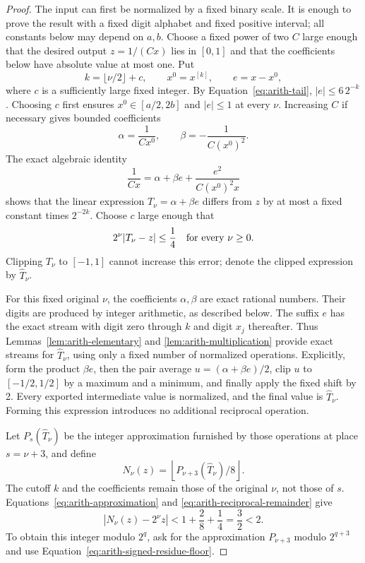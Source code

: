 \begin{proof}
The input can first be normalized by a fixed binary scale.  It is
enough to prove the result with a fixed digit alphabet and fixed
positive interval; all constants below may depend on $a,b$.
Choose a fixed power of two $C$ large enough that the desired output
$z=1/(Cx)$ lies in $[0,1]$ and that the coefficients below have
absolute value at most one.  Put
\[
 k=\lfloor \nu/2\rfloor+c,\qquad x^0=x^{[k]},\qquad e=x-x^0,
\]
where $c$ is a sufficiently large fixed integer.  By
Equation~\eqref{eq:arith-tail}, $|e|\leq 6\,2^{-k}$.  Choosing $c$
first ensures $x^0\in[a/2,2b]$ and $|e|\leq1$ at every $\nu$.
Increasing $C$ if necessary gives bounded coefficients
\[
 \alpha=\frac1{Cx^0},\qquad \beta=-\frac1{C(x^0)^2}.
\]
The exact algebraic identity
\begin{equation}
 \frac1{Cx}=\alpha+\beta e+
               \frac{e^2}{C(x^0)^2x}
 \label{eq:arith-reciprocal-taylor}
\end{equation}
shows that the linear expression $T_\nu=\alpha+\beta e$ differs
from $z$ by at most a fixed constant times $2^{-2k}$.
Choose $c$ large enough that
\begin{equation}
 2^\nu|T_\nu-z|\leq\frac14
 \quad\hbox{for every }\nu\geq0.
 \label{eq:arith-reciprocal-remainder}
\end{equation}
Clipping $T_\nu$ to $[-1,1]$ cannot increase this error; denote the
clipped expression by $\widehat T_\nu$.

For this fixed original $\nu$, the coefficients $\alpha,\beta$ are
exact rational numbers.  Their digits are produced by integer
arithmetic, as described below.  The suffix $e$ has the exact stream
with digit zero through $k$ and digit $x_j$ thereafter.  Thus
Lemmas~\ref{lem:arith-elementary} and
\ref{lem:arith-multiplication} provide exact streams for
$\widehat T_\nu$, using only a fixed number of normalized operations.
Explicitly, form the product $\beta e$, then the pair average
$u=(\alpha+\beta e)/2$, clip $u$ to $[-1/2,1/2]$ by a maximum
and a minimum, and finally apply the fixed shift by 2.  Every
exported intermediate value is normalized, and the final value is
$\widehat T_\nu$.  Forming this expression introduces no additional
reciprocal operation.

Let $P_s(\widehat T_\nu)$ be the integer approximation furnished by
those operations at place $s=\nu+3$, and define
\begin{equation}
 N_\nu(z)=\left\lfloor P_{\nu+3}(\widehat T_\nu)/8\right\rfloor.
 \label{eq:arith-reciprocal-approximation}
\end{equation}
The cutoff $k$ and the coefficients remain those of the original $\nu$,
not those of $s$.  Equations~\eqref{eq:arith-approximation} and
\eqref{eq:arith-reciprocal-remainder} give
\[
 |N_\nu(z)-2^\nu z|<1+\frac28+\frac14=\frac32<2.
\]
To obtain this integer modulo $2^q$, ask for the approximation
$P_{\nu+3}$ modulo $2^{q+3}$ and use
Equation~\eqref{eq:arith-signed-residue-floor}.


\end{proof}
